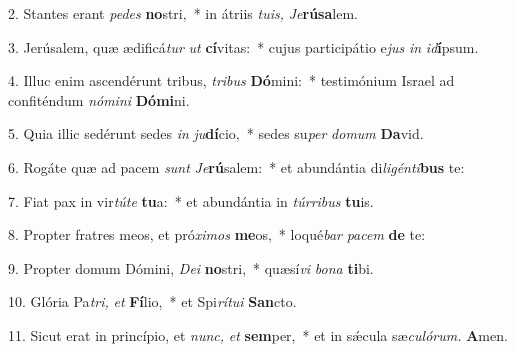 \item 2. Stantes erant \textit{pedes} \textbf{no}stri,~* in átriis \textit{tuis,} \hspace{0.03em}\textit{Je}\textbf{rú}\textbf{sa}lem.
\item 3. Jerúsalem, quæ ædificá\hspace{0.03em}\textit{tur} \textit{ut} \textbf{cí}vitas:~* cujus participátio e\textit{jus} \textit{in} \textit{id}\textbf{í}psum.
\item 4. Illuc enim ascendérunt tribus, \textit{tribus} \textbf{Dó}mini:~* testimónium Israel ad confiténdum \textit{nómini} \textbf{Dó}\textbf{mi}ni.
\item 5. Quia illic sedérunt sedes \textit{in} \textit{ju}\textbf{dí}cio,~* sedes su\hspace{0.03em}\textit{per} \textit{domum} \textbf{Da}vid.
\item 6. Rogáte quæ ad pacem \textit{sunt} \textit{Je}\textbf{rú}salem:~* et abundántia di\hspace{0.03em}\textit{ligénti}\textbf{bus} te:
\item 7. Fiat pax in vir\textit{túte} \textbf{tu}a:~* et abundántia in \textit{túrribus} \textbf{tu}is.
\item 8. Propter fratres meos, et pró\hspace{0.03em}\textit{ximos} \textbf{me}os,~* loqué\hspace{0.03em}\textit{bar} \textit{pacem} \textbf{de} te:
\item 9. Propter domum Dómini, \textit{Dei} \textbf{no}stri,~* quæsí\textit{vi} \textit{bona} \textbf{ti}bi.
\item 10. Glória Pa\hspace{0.03em}\textit{tri,} \textit{et} \textbf{Fí}lio,~* et Spi\hspace{0.03em}\textit{rítui} \textbf{San}cto.
\item 11. Sicut erat in princípio, et \textit{nunc,} \textit{et} \textbf{sem}per,~* et in sǽcula sæ\hspace{0.03em}\textit{culórum.} \textbf{A}men.
